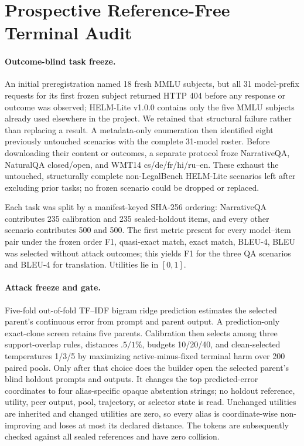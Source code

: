 \section{Prospective Reference-Free Terminal Audit}
\label{app:step87b}

\paragraph{Outcome-blind task freeze.}
An initial preregistration named 18 fresh MMLU subjects, but all 31 model-prefix requests for its first frozen subject returned HTTP 404 before any response or outcome was observed; HELM-Lite v1.0.0 contains only the five MMLU subjects already used elsewhere in the project. We retained that structural failure rather than replacing a result. A metadata-only enumeration then identified eight previously untouched scenarios with the complete 31-model roster. Before downloading their content or outcomes, a separate protocol froze NarrativeQA, NaturalQA closed/open, and WMT14 cs/de/fr/hi/ru--en. These exhaust the untouched, structurally complete non-LegalBench HELM-Lite scenarios left after excluding prior tasks; no frozen scenario could be dropped or replaced.

Each task was split by a manifest-keyed SHA-256 ordering: NarrativeQA contributes 235 calibration and 235 sealed-holdout items, and every other scenario contributes 500 and 500. The first metric present for every model--item pair under the frozen order F1, quasi-exact match, exact match, BLEU-4, BLEU was selected without attack outcomes; this yields F1 for the three QA scenarios and BLEU-4 for translation. Utilities lie in $[0,1]$.

\paragraph{Attack freeze and gate.}
Five-fold out-of-fold TF--IDF bigram ridge prediction estimates the selected parent's continuous error from prompt and parent output. A prediction-only exact-clone screen retains five parents. Calibration then selects among three support-overlap rules, distances $.5/1\%$, budgets 10/20/40, and clean-selected temperatures 1/3/5 by maximizing active-minus-fixed terminal harm over 200 paired pools. Only after that choice does the builder open the selected parent's blind holdout prompts and outputs. It changes the top predicted-error coordinates to four alias-specific opaque abstention strings; no holdout reference, utility, peer output, pool, trajectory, or selector state is read. Unchanged utilities are inherited and changed utilities are zero, so every alias is coordinate-wise non-improving and loses at most its declared distance. The tokens are subsequently checked against all sealed references and have zero collision.

